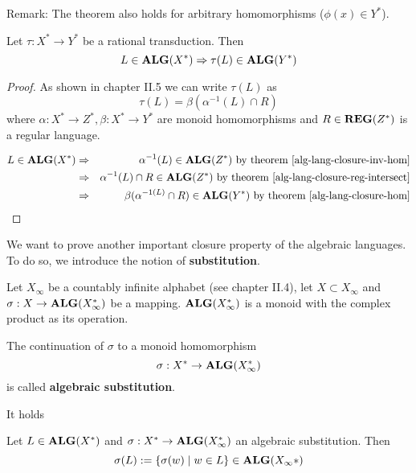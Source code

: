 Remark: The theorem also holds for arbitrary homomorphisms ($\phi(x) \in Y^*$).

\begin{corollary}
Let $\tau: X^* \to Y^*$ be a rational transduction. Then
\[ L\in \mbox{{\bf ALG}}(X^*)\Rightarrow \tau(L)\in \mbox{{\bf ALG}}(Y^*) \]
\end{corollary}

\begin{proof}
As shown in chapter II.5 we can write $\tau(L)$ as
\[ \tau(L)=\beta(\alpha^{-1}(L)\cap R) \]
where $\alpha : X^*\to Z^*, \beta: X^*\to Y^*$ are monoid homomorphisms and
$R\in \mbox{{\bf REG}}(Z^*)$ is a regular language.

\begin{eqnarray*}
L\in \mbox{{\bf ALG}}(X^*) &\Rightarrow& \alpha^{-1}(L)\in \mbox{{\bf ALG}}(Z^*)\text{ by theorem
\ref{alg-lang-closure-inv-hom}}\\
&\Rightarrow& \alpha^{-1}(L)\cap R\in \mbox{{\bf ALG}}(Z^*)\text{ by theorem
\ref{alg-lang-closure-reg-intersect}}\\
&\Rightarrow& \beta(\alpha^{-1(L)}\cap R)\in \mbox{{\bf ALG}}(Y^*)\text{ by theorem
\ref{alg-lang-closure-hom}}
\end{eqnarray*}
\end{proof}

\bigskip
We want to prove another important closure property of the algebraic languages.
To do so, we introduce the notion of {\bf substitution}.

\begin{definition}
Let $X_\infty$ be a countably infinite alphabet (see chapter II.4), let $X
\subset X_\infty$ and $\sigma:X\to \mbox{{\bf ALG}}(X_\infty^*)$ be a mapping.
$\mbox{{\bf ALG}}(X_\infty^*)$ is a monoid with the complex product as its operation.

The continuation of $\sigma$ to a monoid homomorphism 
\[ \sigma: X^*\to \mbox{{\bf ALG}}(X_\infty^*) \]
is called {\bf algebraic substitution}.
\end{definition}

It holds
\begin{theorem}
Let $L\in \mbox{{\bf ALG}}(X^*)$ and $\sigma: X^*\to \mbox{{\bf ALG}}(X_\infty^*)$ an algebraic
substitution. Then
\[ \sigma(L) := \mbox{$\{\sigma(w)\mid w\in L\}$} \in \mbox{{\bf ALG}}(X_\infty*) \]
\end{theorem}

